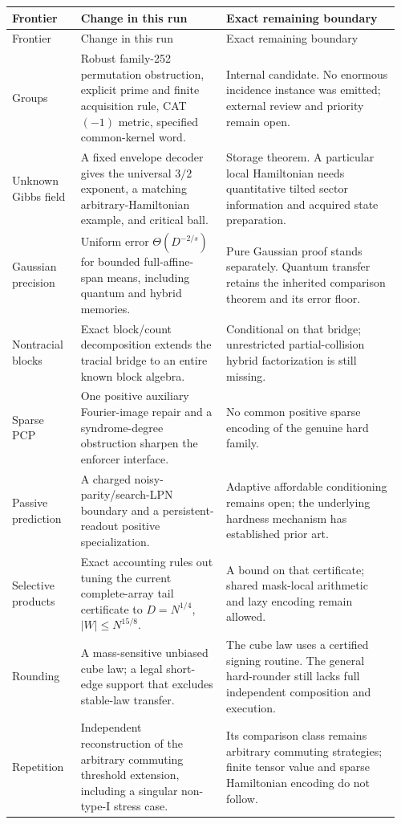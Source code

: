\documentclass[11pt]{article}
\theoremstyle{definition}
\begin{document}
\begin{longtable}{@{}p{0.17\linewidth}p{0.36\linewidth}p{0.43\linewidth}@{}}
\toprule Frontier & Change in this run & Exact remaining boundary\\
\midrule\endfirsthead
\toprule Frontier & Change in this run & Exact remaining boundary\\
\midrule\endhead
Groups & Robust family-252 permutation obstruction, explicit prime and
finite acquisition rule, CAT$(-1)$ metric, specified common-kernel word. &
Internal candidate. No enormous incidence instance was emitted;
external review and priority remain open.\\
Unknown Gibbs field & A fixed envelope decoder gives the universal $3/2$
exponent, a matching arbitrary-Hamiltonian example, and critical ball. &
Storage theorem. A particular local Hamiltonian needs quantitative
tilted sector information and acquired state preparation.\\
Gaussian precision & Uniform error $\Theta(D^{-2/s})$ for bounded
full-affine-span means, including quantum and hybrid memories. &
Pure Gaussian proof stands separately. Quantum transfer retains the
inherited comparison theorem and its error floor.\\
Nontracial blocks & Exact block/count decomposition extends the tracial
bridge to an entire known block algebra. &
Conditional on that bridge; unrestricted partial-collision hybrid
factorization is still missing.\\
Sparse PCP & One positive auxiliary Fourier-image repair and a
syndrome-degree obstruction sharpen the enforcer interface. &
No common positive sparse encoding of the genuine hard family.\\
Passive prediction & A charged noisy-parity/search-LPN boundary and a
persistent-readout positive specialization. &
Adaptive affordable conditioning remains open; the underlying hardness
mechanism has established prior art.\\
Selective products & Exact accounting rules out tuning the current
complete-array tail certificate to $D=N^{1/4}$, $|W|\le N^{15/8}$. &
A bound on that certificate; shared mask-local arithmetic and lazy
encoding remain allowed.\\
Rounding & A mass-sensitive unbiased cube law; a legal short-edge
support that excludes stable-law transfer. &
The cube law uses a certified signing routine. The general hard-rounder
still lacks full independent composition and execution.\\
Repetition & Independent reconstruction of the arbitrary commuting
threshold extension, including a singular non-type-I stress case. &
Its comparison class remains arbitrary commuting strategies;
finite tensor value and sparse Hamiltonian encoding do not follow.\\
\bottomrule
\end{longtable}
\end{document}

